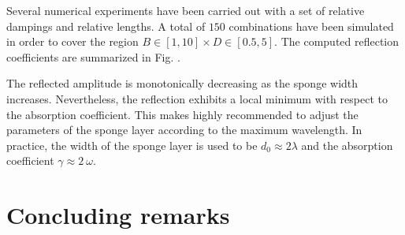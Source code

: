 Several numerical experiments have been carried out with a set of relative dampings and relative lengths. A total of $150$ combinations have been simulated in order to cover the region $B\in[1, 10] \times D\in[0.5, 5]$. The computed reflection coefficients are summarized in Fig. .

The reflected amplitude is monotonically decreasing as the sponge width increases. Nevertheless, the reflection exhibits a local minimum with respect to the absorption coefficient. This makes highly recommended to adjust the parameters of the sponge layer according to the  maximum wavelength.
In practice, the width of the sponge layer is used to be $d_0 \approx 2\lambda$ and the absorption coefficient $\gamma \approx 2\ \omega$.



\section{Concluding remarks}


